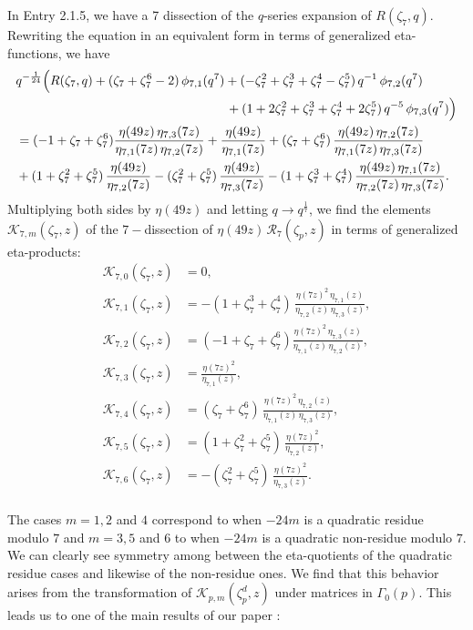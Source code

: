 \documentclass[12pt]{amsart}
\theoremstyle{definition}
\theoremstyle{remark}
\numberwithin{equation}{section}
\newcommand\Rpz[1]{\mathcal{R}_p\left(#1\right)}
\newcommand\Rpzb[2]{\mathcal{R}_{#1}\left(#2\right)}
\begin{document}
In \cite{An-Be-RLNIII} Entry 2.1.5, we have a 7 dissection of the $q$-series expansion of $R(\zeta_7,q)$. Rewriting the equation in an equivalent form in terms of generalized eta-functions, we have
\begin{align}
&q^{-\frac{1}{24}}\Big(R(\zeta_7,q) 
 + (\zeta_7 + \zeta_7^6 - 2) \,\phi_{7,1}(q^7) 
 + (-\zeta_7^2 + \zeta_7^3 + \zeta_7^4 - \zeta_7^5 ) \,q^{-1}\,\phi_{7,2}(q^7)
\\
\nonumber
&\hspace{58mm}+(1+ 2 \zeta_7^2 + \zeta_7^3 + \zeta_7^4 + 2 \zeta_7^5 ) \,q^{-5}\,\phi_{7,3}(q^7)\Big)  
\label{eq:Ramid7V2}\\
&
= (-1+\zeta_7 + \zeta_7^6) \frac{\eta(49z) \, \eta_{7,3}(7z)}{\eta_{7,1}(7z)\, \eta_{7,2}(7z)}
+ \frac{\eta(49z)}{\eta_{7,1}(7z)}
+ (\zeta_7 + \zeta_7^6) \, \frac{\eta(49z) \, \eta_{7,2}(7z)}{\eta_{7,1}(7z)\, \eta_{7,3}(7z)}\\
&
+ (1+\zeta_7^2 + \zeta_7^5) \,  \frac{\eta(49z)}{\eta_{7,2}(7z)}
- (\zeta_7^2 + \zeta_7^5) \,  \frac{\eta(49z)}{\eta_{7,3}(7z)}
- (1+\zeta_7^3 + \zeta_7^4) \, \frac{\eta(49z) \, \eta_{7,1}(7z)}{\eta_{7,2}(7z)\, \eta_{7,3}(7z)}.
\nonumber
\end{align}
Multiplying both sides by $\eta(49z)$ and letting 
$q\rightarrow q^{\frac{1}{7}}$, we  find the elements 
 $\mathcal{K}_{7,m}(\zeta_7, z)$ of the $7-$dissection of 
 $\eta(49z) \, \Rpzb{7}{\zeta_p,z}$ in terms of generalized eta-products:
\begin{align*}
\mathcal{K}_{7,0}(\zeta_7, z)&=0,\\
\mathcal{K}_{7,1}(\zeta_7, z)&=- (1+\zeta_7^3 + \zeta_7^4) \, \frac{\eta(7z)^2 \, \eta_{7,1}(z)}{\eta_{7,2}(z)\, \eta_{7,3}(z)},\\
\mathcal{K}_{7,2}(\zeta_7, z)&=(-1+\zeta_7 + \zeta_7^6) \frac{\eta(7z)^2 \, \eta_{7,3}(z)}{\eta_{7,1}(z)\, \eta_{7,2}(z)},\\
\mathcal{K}_{7,3}(\zeta_7, z)&=\frac{\eta(7z)^2}{\eta_{7,1}(z)},\\
\mathcal{K}_{7,4}(\zeta_7, z)&=(\zeta_7 + \zeta_7^6) \, \frac{\eta(7z)^2 \, \eta_{7,2}(z)}{\eta_{7,1}(z)\, \eta_{7,3}(z)},\\
\mathcal{K}_{7,5}(\zeta_7, z)&=(1+\zeta_7^2 + \zeta_7^5) \,  \frac{\eta(7z)^2}{\eta_{7,2}(z)},\\
\mathcal{K}_{7,6}(\zeta_7, z)&=- (\zeta_7^2 + \zeta_7^5) \,  \frac{\eta(7z)^2}{\eta_{7,3}(z)}.
\end{align*}
\\
The cases $m=1,2$ and $4$ correspond to when $-24m$ is a quadratic residue modulo $7$ and $m=3,5$ and $6$ to when $-24m$ is a quadratic non-residue modulo $7$. We can clearly see symmetry among between the eta-quotients of the quadratic residue cases and likewise of the non-residue ones. We find that this behavior arises from the transformation of $\mathcal{K}_{p,m}(\zeta_p^d,z)$ under matrices in $\Gamma_0(p)$. This leads us to one of the main results of our paper :
\end{document}
